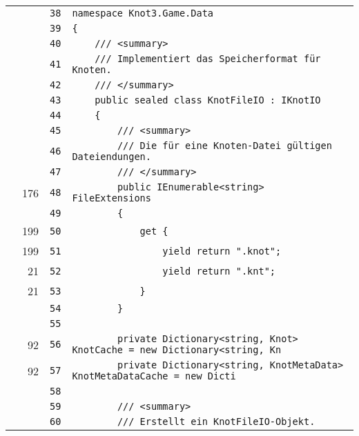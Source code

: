 \documentclass[a4paper,10pt]{article}
\begin{document}
\begin{longtable}[l]{lrrl}
\cellcolor{gray} &  & \verb~38~ & \verb~namespace Knot3.Game.Data~\\
\cellcolor{gray} &  & \verb~39~ & \verb~{~\\
\cellcolor{gray} &  & \verb~40~ & \verb~    /// <summary>~\\
\cellcolor{gray} &  & \verb~41~ & \verb~    /// Implementiert das Speicherformat für Knoten.~\\
\cellcolor{gray} &  & \verb~42~ & \verb~    /// </summary>~\\
\cellcolor{gray} &  & \verb~43~ & \verb~    public sealed class KnotFileIO : IKnotIO~\\
\cellcolor{gray} &  & \verb~44~ & \verb~    {~\\
\cellcolor{gray} &  & \verb~45~ & \verb~        /// <summary>~\\
\cellcolor{gray} &  & \verb~46~ & \verb~        /// Die für eine Knoten-Datei gültigen Dateiendungen.~\\
\cellcolor{gray} &  & \verb~47~ & \verb~        /// </summary>~\\
\cellcolor{green} & 176 & \verb~48~ & \verb~        public IEnumerable<string> FileExtensions~\\
\cellcolor{gray} &  & \verb~49~ & \verb~        {~\\
\cellcolor{green} & 199 & \verb~50~ & \verb~            get {~\\
\cellcolor{green} & 199 & \verb~51~ & \verb~                yield return ".knot";~\\
\cellcolor{green} & 21 & \verb~52~ & \verb~                yield return ".knt";~\\
\cellcolor{green} & 21 & \verb~53~ & \verb~            }~\\
\cellcolor{gray} &  & \verb~54~ & \verb~        }~\\
\cellcolor{gray} &  & \verb~55~ & \verb~~\\
\cellcolor{green} & 92 & \verb~56~ & \verb~        private Dictionary<string, Knot> KnotCache = new Dictionary<string, Kn~\\
\cellcolor{green} & 92 & \verb~57~ & \verb~        private Dictionary<string, KnotMetaData> KnotMetaDataCache = new Dicti~\\
\cellcolor{gray} &  & \verb~58~ & \verb~~\\
\cellcolor{gray} &  & \verb~59~ & \verb~        /// <summary>~\\
\cellcolor{gray} &  & \verb~60~ & \verb~        /// Erstellt ein KnotFileIO-Objekt.~\\

\end{longtable}
\end{document}
